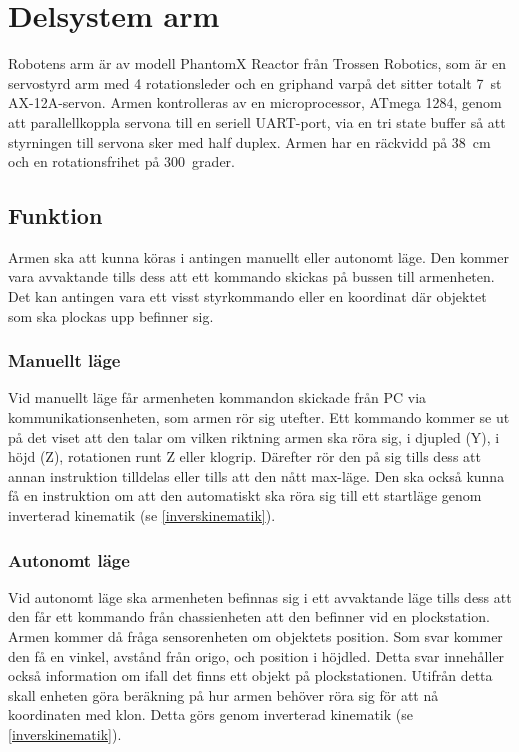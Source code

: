 

\section{Delsystem arm}

Robotens arm är av modell PhantomX Reactor från Trossen Robotics, som är en servostyrd arm med 4 rotationsleder och en griphand varpå det sitter totalt 7~st AX-12A-servon. Armen kontrolleras av en microprocessor, ATmega 1284, genom att parallellkoppla servona till en seriell UART-port, via en tri state buffer så att styrningen till servona sker med half duplex. Armen har en räckvidd på 38~cm och en rotationsfrihet på 300~grader. 


\subsection{Funktion}

Armen ska att kunna köras i antingen manuellt eller autonomt läge. Den kommer vara avvaktande tills dess att ett kommando skickas på bussen till armenheten. Det kan antingen vara ett visst styrkommando eller en koordinat där objektet som ska plockas upp befinner sig.


\subsubsection{Manuellt läge} 

Vid manuellt läge får armenheten kommandon skickade från PC via kommunikationsenheten, som armen rör sig utefter. Ett kommando kommer se ut på det viset att den talar om vilken riktning armen ska röra sig, i djupled (Y), i höjd (Z), rotationen runt Z eller klogrip. Därefter rör den på sig tills dess att annan instruktion tilldelas eller tills att den nått max-läge. Den ska också kunna få en instruktion om att den automatiskt ska röra sig till ett startläge genom inverterad kinematik (se \ref{inverskinematik}). 

\subsubsection{Autonomt läge}

Vid autonomt läge ska armenheten befinnas sig i ett avvaktande läge tills dess att den får ett kommando från chassienheten att den befinner vid en plockstation. Armen kommer då fråga sensorenheten om objektets position. Som svar kommer den få en vinkel, avstånd från origo, och position i höjdled. Detta svar innehåller också information om ifall det finns ett objekt på plockstationen. Utifrån detta skall enheten göra beräkning på hur armen behöver röra sig för att nå koordinaten med klon. Detta görs genom inverterad kinematik (se \ref{inverskinematik}).

